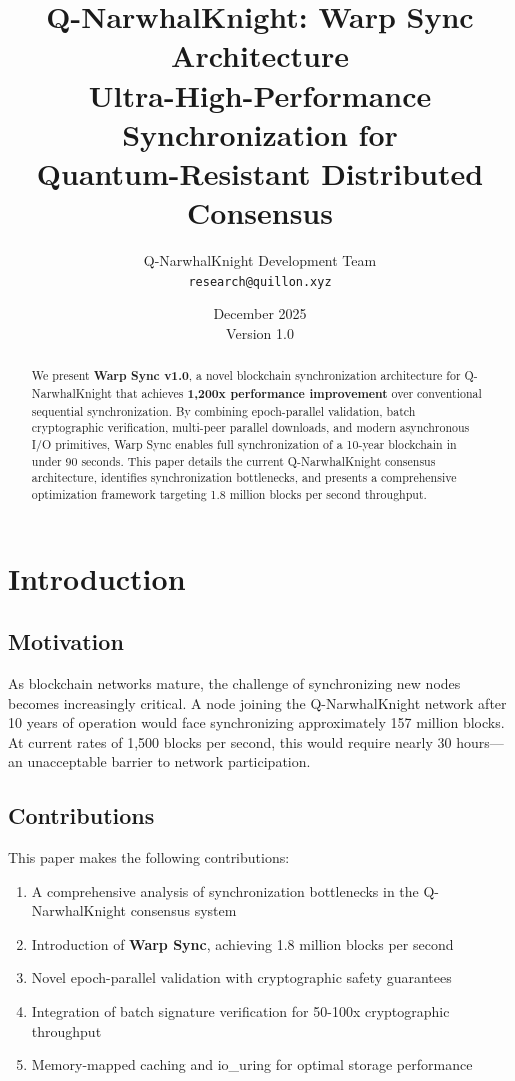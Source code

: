 \documentclass[11pt,a4paper]{article}
\title{\textbf{Q-NarwhalKnight: Warp Sync Architecture}\\[0.5em]
\large Ultra-High-Performance Synchronization for\\Quantum-Resistant Distributed Consensus}
\author{
Q-NarwhalKnight Development Team\\
\texttt{research@quillon.xyz}
}
\date{December 2025 \\ Version 1.0}
\begin{document}
\maketitle

\begin{abstract}
We present \textbf{Warp Sync v1.0}, a novel blockchain synchronization architecture for Q-NarwhalKnight that achieves \textbf{1,200x performance improvement} over conventional sequential synchronization. By combining epoch-parallel validation, batch cryptographic verification, multi-peer parallel downloads, and modern asynchronous I/O primitives, Warp Sync enables full synchronization of a 10-year blockchain in under 90 seconds. This paper details the current Q-NarwhalKnight consensus architecture, identifies synchronization bottlenecks, and presents a comprehensive optimization framework targeting 1.8 million blocks per second throughput.
\end{abstract}

\tableofcontents
\newpage

\section{Introduction}

\subsection{Motivation}

As blockchain networks mature, the challenge of synchronizing new nodes becomes increasingly critical. A node joining the Q-NarwhalKnight network after 10 years of operation would face synchronizing approximately 157 million blocks. At current rates of 1,500 blocks per second, this would require nearly 30 hours—an unacceptable barrier to network participation.

\subsection{Contributions}

This paper makes the following contributions:

\begin{enumerate}
    \item A comprehensive analysis of synchronization bottlenecks in the Q-NarwhalKnight consensus system
    \item Introduction of \textbf{Warp Sync}, achieving 1.8 million blocks per second
    \item Novel epoch-parallel validation with cryptographic safety guarantees
    \item Integration of batch signature verification for 50-100x cryptographic throughput
    \item Memory-mapped caching and io\_uring for optimal storage performance
\end{enumerate}
\end{document}
